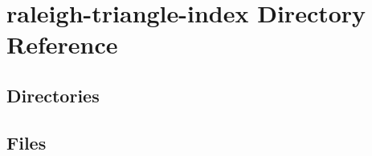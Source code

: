 \section{raleigh-\/triangle-\/index Directory Reference}
\label{dir_ff17e0f692be31f20bd20655464cecdf}
\subsection*{Directories}
\begin{DoxyCompactItemize}
\end{DoxyCompactItemize}
\subsection*{Files}
\begin{DoxyCompactItemize}
\end{DoxyCompactItemize}
